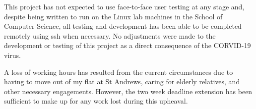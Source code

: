 This project has not expected to use face-to-face user testing at any stage and, despite being written to run on the Linux lab machines in the School of Computer Science, all testing and development has been able to be completed remotely using ssh when necessary. No adjustments were made to the development or testing of this project as a direct consequence of the CORVID-19 virus.

A loss of working hours has resulted from the current circumstances due to having to move out of my flat at St Andrews, caring for elderly relatives, and other necessary engagements. However, the two week deadline extension has been sufficient to make up for any work lost during this upheaval.
